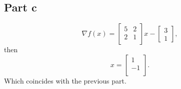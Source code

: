 \documentclass{article}
\begin{document}
\subsection*{Part c}
\[
\nabla f(x)=\begin{bmatrix}
	5 & 2 \\
	2 & 1\\
	\end{bmatrix}x
	- \begin{bmatrix}
	3\\
	1
	\end{bmatrix},
\]
then
\[
	x=\begin{bmatrix}
	1\\
	-1\\
	\end{bmatrix}.
\]
Which coincides with the previous part.
\end{document}
